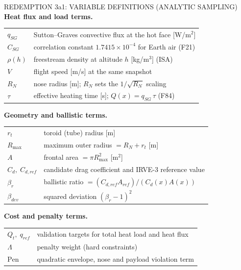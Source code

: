 \documentclass[aspectratio=169,11pt]{beamer}
\begin{document}
\begin{frame}{REDEMPTION 3a1: VARIABLE DEFINITIONS (ANALYTIC SAMPLING)}
  \footnotesize
  \textbf{Heat flux and load terms.}
  \begin{tabular}{@{}ll@{}}
  $q_{SG}$ & Sutton--Graves convective flux at the hot face [W/m$^2$]\\
  $C_{SG}$ & correlation constant $1.7415\times10^{-4}$ for Earth air (F21)\\
  $\rho(h)$ & freestream density at altitude $h$ [kg/m$^3$] (ISA)\\
  $V$ & flight speed [m/s] at the same snapshot\\
  $R_N$ & nose radius [m]; $R_N$ sets the $1/\sqrt{R_N}$ scaling\\
  $\tau$ & effective heating time [s]; $Q(x)=q_{SG}\,\tau$ (F84)\\
  \end{tabular}\par
  \vspace{0.1cm}
  \textbf{Geometry and ballistic terms.}
  \begin{tabular}{@{}ll@{}}
  $r_t$ & toroid (tube) radius [m]\\
  $R_{\max}$ & maximum outer radius $=R_N+r_t$ [m]\\
  $A$ & frontal area $=\pi R_{\max}^2$ [m$^2$]\\
  $C_d,\;C_{d,ref}$ & candidate drag coefficient and IRVE-3 reference value\\
  $\beta_r$ & ballistic ratio $=(C_{d,ref}A_{ref})/(C_d(x)A(x))$\\
  $\beta_{dev}$ & squared deviation $(\beta_r-1)^2$\\
  \end{tabular}\par
  \vspace{0.1cm}
  \textbf{Cost and penalty terms.}
  \begin{tabular}{@{}ll@{}}
  $Q_t,\;q_{ref}$ & validation targets for total heat load and heat flux\\
  $\Lambda$ & penalty weight (hard constraints)\\
  $\mathrm{Pen}$ & quadratic envelope, nose and payload violation term\\
  \end{tabular}
\end{frame}
\end{document}
